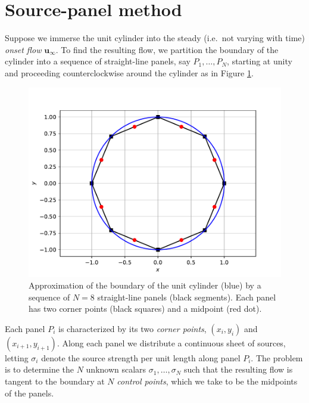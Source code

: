 \documentclass[10pt]{article}
\newcommand\figref[1]{Figure \ref{#1}}
\newcommand\defn[1]{\emph{#1}}
\def\ie{i.e.~}
\begin{document}
\section{Source-panel method}
Suppose we immerse the unit cylinder into the steady (\ie not varying with time) \defn{onset flow} $\mathbf u_\infty$.  To find the resulting flow, we partition the boundary of the cylinder into a sequence of straight-line panels, say $P_1,\ldots,P_N$, starting at unity and proceeding counterclockwise around the cylinder as in \figref{fig:cylinder_panels}.
\begin{figure}[htbp]
\begin{center}
\includegraphics[scale=.5]{plots/cylinder_panels.pdf}
\caption{Approximation of the boundary of the unit cylinder (blue) by a sequence of $N=8$ straight-line panels (black segments).  Each panel has two corner points (black squares) and a midpoint (red dot).}\label{fig:cylinder_panels}
\end{center}
\end{figure}
Each panel $P_i$ is characterized by its two \defn{corner points}, $(x_i,y_i)$ and $(x_{i+1},y_{i+1})$.  Along each panel we distribute a continuous sheet of sources, letting $\sigma_i$ denote the source strength per unit length along panel $P_i$.  The problem is to determine the $N$ unknown scalars $\sigma_1,\ldots,\sigma_N$ such that the resulting flow is tangent to the boundary at $N$ \defn{control points}, which we take to be the midpoints of the panels.
\end{document}
